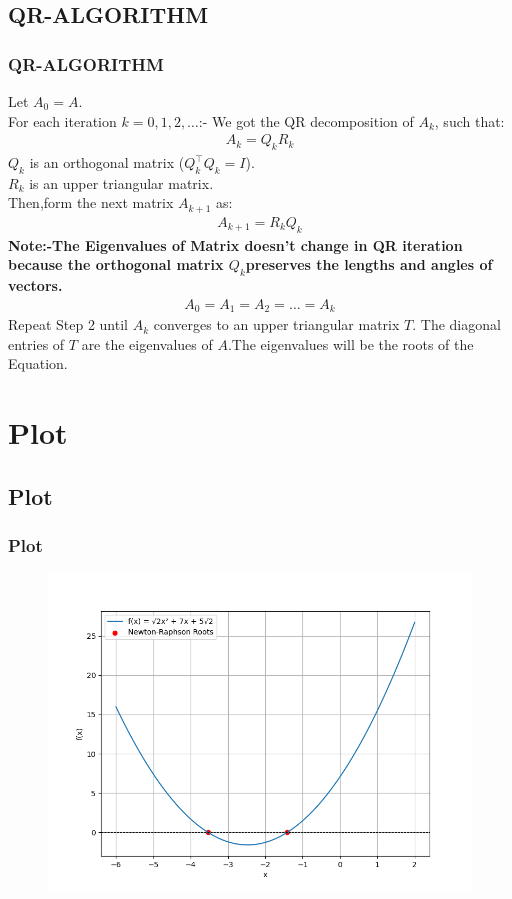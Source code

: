 \documentclass{beamer}
\theoremstyle{remark}
\numberwithin{equation}{section}
\begin{document}
\subsection{QR-ALGORITHM}
\begin{frame}
\frametitle{QR-ALGORITHM}

Let $A_0 = A $.\\
For each iteration $ k = 0, 1, 2, \dots $:-
   We got the QR decomposition of $ A_k $, such that:
    \begin{align}
    A_k = Q_k R_k
    \end{align}
    $Q_k $ is an orthogonal matrix ($ Q_k^\top Q_k = I $).\\
  $ R_k $ is an upper triangular matrix.\\
Then,form the next matrix $ A_{k+1} $ as:
    \begin{align}
    A_{k+1} = R_k Q_k
    \end{align}
\textbf{Note:-The Eigenvalues of Matrix doesn't change in QR iteration because the orthogonal matrix $Q_k$​ preserves the lengths and angles of vectors.}
  \begin{align}
    A_0 =A_1 =A_2 = \dots = A_k
    \end{align}
Repeat Step 2 until $ A_k $ converges to an upper triangular matrix $ T $. The diagonal entries of $T$ are the eigenvalues of $A$.The eigenvalues will be the roots of the Equation.

\end{frame}



\section{Plot}
\subsection{Plot}
\begin{frame}
\frametitle{Plot}

\begin{figure}[h!]
   \centering
   \includegraphics[width=0.7\linewidth]{figs/Figure_1.png}
\end{figure}

\end{frame}
\end{document}
